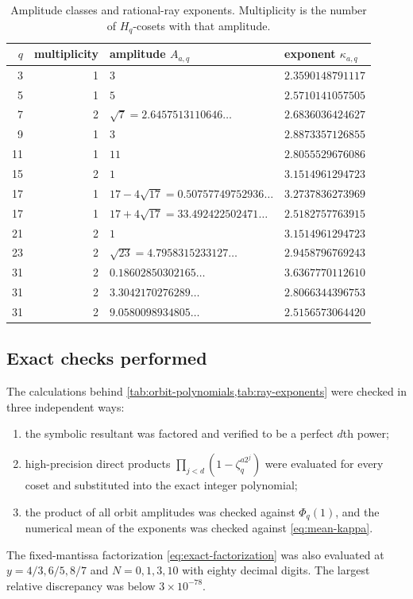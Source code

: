 \documentclass[11pt,oneside]{article}
\theoremstyle{definition}
\theoremstyle{remark}
\begin{document}
\begin{table}[ht]
\centering\footnotesize
\begin{tabularx}{\textwidth}{@{}r r X X@{}}
\toprule
$q$ & multiplicity & amplitude $A_{a,q}$ & exponent $\kappa_{a,q}$ \\
\midrule
3  & 1 & $3$ & $2.3590148791117$ \\
5  & 1 & $5$ & $2.5710141057505$ \\
7  & 2 & $\sqrt7=2.6457513110646\ldots$ & $2.6836036424627$ \\
9  & 1 & $3$ & $2.8873357126855$ \\
11 & 1 & $11$ & $2.8055529676086$ \\
15 & 2 & $1$ & $3.1514961294723$ \\
17 & 1 & $17-4\sqrt{17}=0.50757749752936\ldots$ & $3.2737836273969$ \\
17 & 1 & $17+4\sqrt{17}=33.492422502471\ldots$ & $2.5182757763915$ \\
21 & 2 & $1$ & $3.1514961294723$ \\
23 & 2 & $\sqrt{23}=4.7958315233127\ldots$ & $2.9458796769243$ \\
31 & 2 & $0.18602850302165\ldots$ & $3.6367770112610$ \\
31 & 2 & $3.3042170276289\ldots$ & $2.8066344396753$ \\
31 & 2 & $9.0580098934805\ldots$ & $2.5156573064420$ \\
\bottomrule
\end{tabularx}
\caption{Amplitude classes and rational-ray exponents. Multiplicity is the number
of $H_q$-cosets with that amplitude.}
\label{tab:ray-exponents}
\end{table}

\subsection{Exact checks performed}

The calculations behind \cref{tab:orbit-polynomials,tab:ray-exponents} were checked
in three independent ways:
\begin{enumerate}
 \item the symbolic resultant was factored and verified to be a perfect $d$th
 power;
 \item high-precision direct products $\prod_{j<d}(1-\zeta_q^{a2^j})$ were evaluated
 for every coset and substituted into the exact integer polynomial;
 \item the product of all orbit amplitudes was checked against $\Phi_q(1)$, and the
 numerical mean of the exponents was checked against \eqref{eq:mean-kappa}.
\end{enumerate}
The fixed-mantissa factorization \eqref{eq:exact-factorization} was also evaluated
at $y=4/3,6/5,8/7$ and $N=0,1,3,10$ with eighty decimal digits. The largest relative
discrepancy was below $3\times10^{-78}$.
\end{document}
